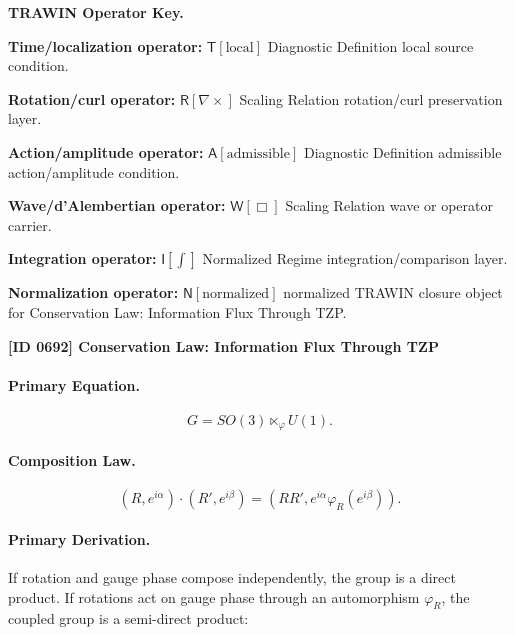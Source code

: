 \par\vspace{0.45\baselineskip}
\noindent\begin{minipage}[t]{\linewidth}
\begingroup
\small
\raggedright
\textbf{TRAWIN Operator Key.}\par
\noindent\textbf{Time/localization operator:} $\mathsf{T}\!\left[\mathrm{local}\right]$ Diagnostic Definition local source condition.\par
\noindent\textbf{Rotation/curl operator:} $\mathsf{R}\!\left[\nabla\times\right]$ Scaling Relation rotation/curl preservation layer.\par
\noindent\textbf{Action/amplitude operator:} $\mathsf{A}\!\left[\mathrm{admissible}\right]$ Diagnostic Definition admissible action/amplitude condition.\par
\noindent\textbf{Wave/d'Alembertian operator:} $\mathsf{W}\!\left[\Box\right]$ Scaling Relation wave or operator carrier.\par
\noindent\textbf{Integration operator:} $\mathsf{I}\!\left[\int\right]$ Normalized Regime integration/comparison layer.\par
\noindent\textbf{Normalization operator:} $\mathsf{N}\!\left[\mathrm{normalized}\right]$ normalized TRAWIN closure object for Conservation Law: Information Flux Through TZP.\par
\endgroup
\end{minipage}

\clearpage
\noindent\textbf{[ID 0692] Conservation Law: Information Flux Through TZP}\par
\vspace{0.35em}
\paragraph{Primary Equation.}
\begin{equation}
G=SO(3)\ltimes_{\varphi} U(1).
\end{equation}

\paragraph{Composition Law.}
\begin{equation}
(R,e^{i\alpha})\cdot(R',e^{i\beta})
=
\left(
RR',
e^{i\alpha}\varphi_R(e^{i\beta})
\right).
\end{equation}

\paragraph{Primary Derivation.}
If rotation and gauge phase compose independently, the group is a direct product.  
If rotations act on gauge phase through an automorphism $\varphi_R$, the coupled group is a semi-direct product:

